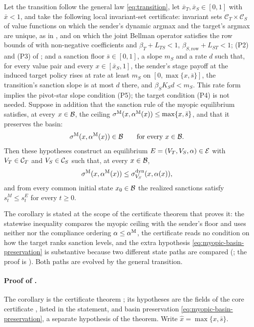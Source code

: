 \begin{corollary}
\label{cor:pathwise-dominance}
Let the transition follow the general law \eqref{eq:transition}, let
$\bar x_T,\bar x_S\in[0,1]$ with $\bar x<1$, and take the following
local invariant-set certificate: invariant sets $\mathcal C_T\times\mathcal C_S$ of value functions
on which the sender's dynamic argmax and the target's argmax are unique, as in
, and on which the joint Bellman operator satisfies the row
bounds of  with non-negative coefficients and
$\beta_T+L_{TS}<1$, $\beta_{S,\mathrm{row}}+L_{ST}<1$; \textup{(P2)}
and \textup{(P3)} of ; and a sanction floor
$\bar s\in[0,1]$, a slope $m_S$ and a rate $d$ such that, for every value
pair and every $x\in[\bar x_S,1]$, the sender's stage payoff at the induced
target policy rises at rate at least $m_S$ on $[0,\max\{x,\bar s\}]$, the
transition's sanction slope is at most $d$ there, and $\beta_SK_Sd<m_S$. This
rate form implies the pivot-star slope condition \textup{(P5)}; the target condition
\textup{(P4)} is not needed. Suppose in addition that the sanction rule of the
myopic equilibrium satisfies, at every $x\in\mathcal{B}$, the ceiling
$\sigma^{\mathrm{M}}(x,\alpha^{\mathrm{M}}(x))\le\max\{x,\bar s\}$, and that it preserves the basin:
\begin{equation}
\sigma^{\mathrm{M}}(x,\alpha^{\mathrm{M}}(x))\in\mathcal{B}
\qquad\text{for every }x\in\mathcal{B}.
\label{eq:myopic-basin-preservation}
\end{equation}
Then these hypotheses construct an equilibrium $E=(V_T,V_S,\alpha)\in\mathcal E$
with $V_T\in\mathcal C_T$ and $V_S\in\mathcal C_S$ such that, at every
$x\in\mathcal{B}$,
\[
\sigma^{\mathrm{M}}(x,\alpha^{\mathrm{M}}(x))\le\sigma^{\mathrm{dyn}}_{V_S}(x,\alpha(x)),
\]
and from every common initial state $x_0\in\mathcal{B}$ the
realized sanctions satisfy $s^M_t\le s^E_t$ for every $t\ge0$.
\end{corollary}

The corollary is stated at the scope of the certificate theorem that proves
it: the statewise inequality compares the myopic ceiling with the sender's
floor and uses neither  nor the compliance ordering
$\alpha\le\alpha^{\mathrm{M}}$, the certificate reads no condition on how the target ranks
sanction levels, and the extra hypothesis \eqref{eq:myopic-basin-preservation}
is substantive because two different state paths are compared
(; the proof is ). Both
paths are evolved by the general transition.

\paragraph{Proof of .}
\label{app:proof-pathwise}
The corollary is the certificate theorem ;
its hypotheses are the fields of the core certificate
, listed in the statement, and basin
preservation \eqref{eq:myopic-basin-preservation}, a separate hypothesis of the
theorem. Write
$\hat x=\max\{x,\bar s\}$.

